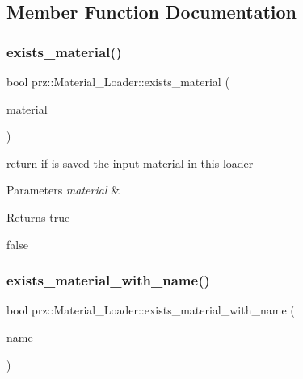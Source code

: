 \subsection{Member Function Documentation}
\mbox{\label{classprz_1_1_material___loader_a1f790777071e92d5bcd4603b65736aa4}} 
\subsubsection{\texorpdfstring{exists\_material()}{exists\_material()}}
{\footnotesize\ttfamily bool prz\+::\+Material\+\_\+\+Loader\+::exists\+\_\+material (\begin{DoxyParamCaption}\item[{P\+S\+Ptr$<$ \mbox{\hyperlink{classprz_1_1_material}{Material}} $>$}]{material }\end{DoxyParamCaption})}



return if is saved the input material in this loader 


\begin{DoxyParams}{Parameters}
{\em material} & \\
\hline
\end{DoxyParams}
\begin{DoxyReturn}{Returns}
true 

false 
\end{DoxyReturn}
\mbox{\label{classprz_1_1_material___loader_a1cd698bffd010f816ce4e84e66213647}} 
\subsubsection{\texorpdfstring{exists\_material\_with\_name()}{exists\_material\_with\_name()}}
{\footnotesize\ttfamily bool prz\+::\+Material\+\_\+\+Loader\+::exists\+\_\+material\+\_\+with\+\_\+name (\begin{DoxyParamCaption}\item[{const P\+String \&}]{name }\end{DoxyParamCaption})}



